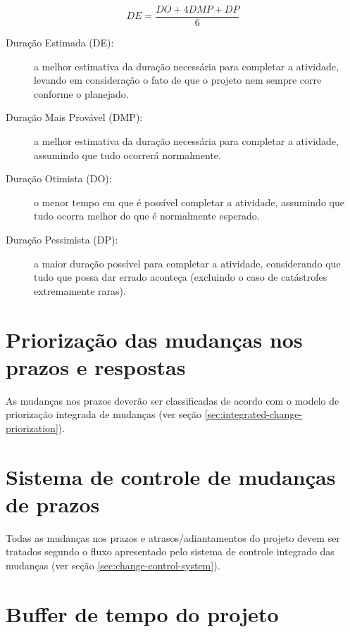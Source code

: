 \begin{itemize}
	      \begin{equation}\label{eq:time-pert}
		      DE = \frac{DO+4DMP+DP}{6}
	      \end{equation}

	      \begin{description}
		      \item[Duração Estimada (DE):] a melhor estimativa da duração necessária para completar a atividade, levando em consideração o fato de que o projeto nem sempre corre conforme o planejado.
		      \item[Duração Mais Provável (DMP):] a melhor estimativa da duração necessária para completar a atividade, assumindo que tudo ocorrerá normalmente.
		      \item[Duração Otimista (DO):] o menor tempo em que é possível completar a atividade, assumindo que tudo ocorra melhor do que é normalmente esperado.
		      \item[Duração Pessimista (DP):] a maior duração possível para completar a atividade, considerando que tudo que possa dar errado aconteça (excluindo o caso de catástrofes extremamente raras).
	      \end{description}

\end{itemize}

\section{Priorização das mudanças nos prazos e respostas}

As mudanças nos prazos deverão ser classificadas de acordo com o modelo de priorização integrada de mudanças (ver seção \ref{sec:integrated-change-priorization}).

\section{Sistema de controle de mudanças de prazos}

Todas as mudanças nos prazos e atrasos/adiantamentos do projeto devem ser tratados segundo o fluxo apresentado pelo sistema de controle integrado das mudanças (ver seção \ref{sec:change-control-system}).


\section{Buffer de tempo do projeto}

